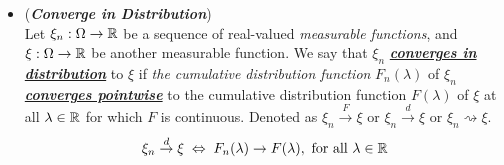 \documentclass[11pt]{article}
\begin{document}
\begin{itemize}
\item 
\begin{definition}  (\emph{\textbf{Converge in Distribution}}) \citep{van2000asymptotic}\\
Let $\xi_n : \Omega \rightarrow {\mathbb R}$ be a sequence of real-valued \emph{measurable functions}, and $\xi: \Omega \rightarrow {\mathbb R}$ be another measurable function. We say that $\xi_n$ \underline{\emph{\textbf{converges in distribution}}} to $\xi$ if \emph{the cumulative distribution function} $F_n(\lambda)$ of $\xi_n$
\underline{\emph{\textbf{converges pointwise}}} to the cumulative distribution function $F(\lambda)$ of $\xi$ at all $\lambda \in  {\mathbb R}$ for which $F$ is continuous. Denoted as $\xi_{n}\stackrel{F}{\rightarrow} \xi$ or \underline{$\xi_{n}\stackrel{d}{\rightarrow} \xi$} or \underline{$\xi_n \rightsquigarrow \xi$}. 
\begin{align*}
\xi_{n}\stackrel{d}{\rightarrow} \xi \; \Leftrightarrow \; F_n(\lambda) \rightarrow F(\lambda), \text{ for all }\lambda \in {\mathbb R}
\end{align*}
\end{definition}


\end{itemize}
\end{document}
